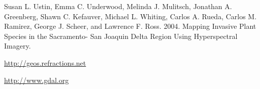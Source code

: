 \documentclass{elsart}
\begin{document}
\begin{thebibliography}{}


	
	Susan L. Ustin, Emma C. Underwood, Melinda
	J. Mulitsch, Jonathan A. Greenberg, Shawn C. Kefauver, Michael L.
	Whiting, Carlos A. Rueda, Carlos M. Ramirez, George J. Scheer, and Lawrence
	F. Ross. 2004.
	Mapping Invasive Plant Species in the Sacramento- San Joaquin Delta Region
	Using Hyperspectral Imagery.
	

	
	\url{http://geos.refractions.net}	

	
	\url{http://www.gdal.org}	

\end{thebibliography}
\end{document}
